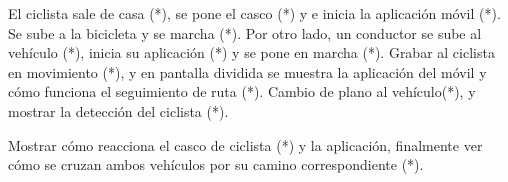 El ciclista sale de casa (*), se pone el casco (*) y e inicia la aplicación móvil (*). Se sube a la bicicleta y se marcha (*). Por otro lado, un conductor se sube al vehículo (*), inicia su aplicación (*) y se pone en marcha (*). Grabar al ciclista en movimiento (*), y en pantalla dividida se muestra la aplicación del móvil y cómo funciona el seguimiento de ruta (*). Cambio de plano al vehículo(*), y mostrar la detección del ciclista (*).

Mostrar cómo reacciona el casco de ciclista (*) y la aplicación, finalmente ver cómo se cruzan ambos vehículos por su camino correspondiente (*).